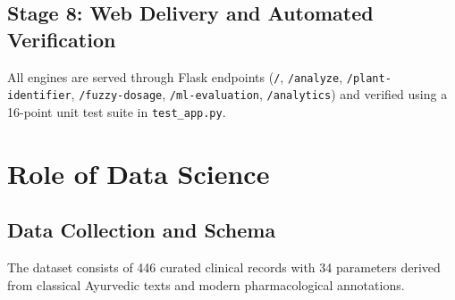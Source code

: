 \documentclass[12pt,a4paper]{article}
\begin{document}
\subsection{Stage 8: Web Delivery and Automated Verification}
All engines are served through Flask endpoints (\texttt{/}, \texttt{/analyze}, \texttt{/plant-identifier}, \texttt{/fuzzy-dosage}, \texttt{/ml-evaluation}, \texttt{/analytics}) and verified using a 16-point unit test suite in \texttt{test\_app.py}.

\newpage
\section{Role of Data Science}

\subsection{Data Collection and Schema}
The dataset consists of 446 curated clinical records with 34 parameters derived from classical Ayurvedic texts and modern pharmacological annotations.
\end{document}
